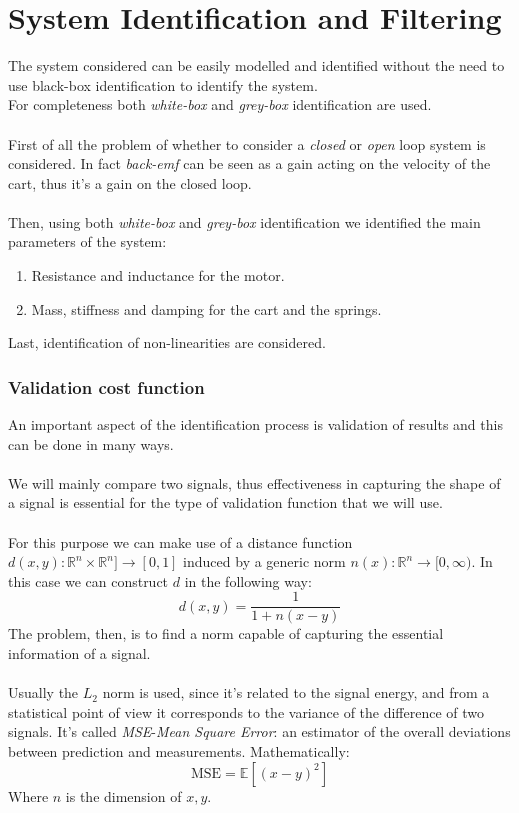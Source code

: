 \part{System Identification and Filtering}
The system considered can be easily modelled and identified without the need to use black-box identification to identify the system. \\ For completeness both \emph{white-box} and \emph{grey-box} identification are used.\\ \\
First of all the problem of whether to consider a \emph{closed} or \emph{open} loop system is considered. In fact \emph{back-emf} can be seen as a gain acting on the velocity of the cart, thus it's a gain on the closed loop.\\ \\
Then, using both \emph{white-box} and \emph{grey-box} identification we identified the main parameters of the system: 
\begin{enumerate}
\item Resistance and inductance for the motor.
\item Mass, stiffness and damping for the cart and the springs.
\end{enumerate}
Last, identification of non-linearities are considered.
\section{Validation cost function}
\label{sec:validation_cost_function}
An important aspect of the identification process is validation of results and this can be done in many ways. \\ \\
We will mainly compare two signals, thus effectiveness in capturing the shape of  a signal is essential for the type of validation function that we will use. \\  \\
For this purpose we can make use of a distance function $d(x,y): \mathbb{R}^n \times \mathbb{R}^n]\to [0,1]$ induced by a generic norm $n(x) : \mathbb{R}^n \to [0,\infty)$. In this case we can construct $d$ in the following way:
$$d(x,y) = \frac{1}{1+n(x-y)}$$
 The problem, then, is to find a norm capable of capturing the essential information of a signal. \\ \\Usually the $L_2$ norm is used, since it's related to the signal energy, and from a statistical point of view it corresponds to the variance of the difference of two signals. It's called \emph{MSE}-\emph{Mean Square Error}: an estimator of the overall deviations between prediction and measurements. Mathematically:
$$\text{MSE} =  \mathbb{E}[(x-y)^2]$$
Where $n$ is the dimension of $x,y$.

